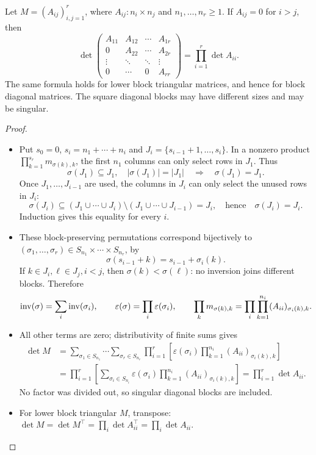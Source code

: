 \begin{theorem}\label{thm:05:block-triangular}
Let \(M=(A_{ij})_{i,j=1}^r\), where \(A_{ij}:n_i\times n_j\) and
\(n_1,\ldots,n_r\geqslant1\). If \(A_{ij}=0\) for \(i>j\), then
\[
\det\begin{pmatrix}
A_{11}&A_{12}&\cdots&A_{1r}\\
0&A_{22}&\cdots&A_{2r}\\
\vdots&\ddots&\ddots&\vdots\\
0&\cdots&0&A_{rr}
\end{pmatrix}
=\prod_{i=1}^r\det A_{ii}.
\]
The same formula holds for lower block triangular matrices, and hence
for block diagonal matrices. The square diagonal blocks may have
different sizes and may be singular.
\end{theorem}
\begin{proof}
\begin{itemize}
\item Put \(s_0=0\), \(s_i=n_1+\cdots+n_i\) and
  \(J_i=\{s_{i-1}+1,\ldots,s_i\}\).
  In a nonzero product \(\prod_{k=1}^{s_r}m_{\sigma(k),k}\), the first
  \(n_1\) columns can only select rows in \(J_1\). Thus
  \[
  \sigma(J_1)\subseteq J_1,\quad |\sigma(J_1)|=|J_1|
  \quad\Longrightarrow\quad\sigma(J_1)=J_1.
  \]
  Once \(J_1,\ldots,J_{i-1}\) are used, the columns in \(J_i\)
  can only select the unused rows in \(J_i\):
  \[
  \sigma(J_i)\subseteq (J_1\cup\cdots\cup J_i)
                 \setminus(J_1\cup\cdots\cup J_{i-1})=J_i,
  \quad\text{hence}\quad\sigma(J_i)=J_i.
  \]
  Induction gives this equality for every \(i\).
\item These block-preserving permutations correspond bijectively to
  \((\sigma_1,\ldots,\sigma_r)\in S_{n_1}\times\cdots\times S_{n_r}\), by
  \[
  \sigma(s_{i-1}+k)=s_{i-1}+\sigma_i(k).
  \]
  If \(k\in J_i,\ell\in J_j,i<j\), then \(\sigma(k)<\sigma(\ell)\):
  no inversion joins different blocks. Therefore
  \[
  \operatorname{inv}(\sigma)=\sum_i\operatorname{inv}(\sigma_i),\qquad
  \varepsilon(\sigma)=\prod_i\varepsilon(\sigma_i),\qquad
  \prod_k m_{\sigma(k),k}
    =\prod_i\prod_{k=1}^{n_i}(A_{ii})_{\sigma_i(k),k}.
  \]
\item All other terms are zero; distributivity of finite sums gives
  \[
  \begin{aligned}
  \det M
  &=\sum_{\sigma_1\in S_{n_1}}\cdots\sum_{\sigma_r\in S_{n_r}}
    \prod_{i=1}^r\left[\varepsilon(\sigma_i)
                      \prod_{k=1}^{n_i}(A_{ii})_{\sigma_i(k),k}\right]\\
  &=\prod_{i=1}^r\left[\sum_{\sigma_i\in S_{n_i}}\varepsilon(\sigma_i)
                      \prod_{k=1}^{n_i}(A_{ii})_{\sigma_i(k),k}\right]
   =\prod_{i=1}^r\det A_{ii}.
  \end{aligned}
  \]
  No factor was divided out, so singular diagonal blocks are included.
\item For lower block triangular \(M\), transpose:
  \(\det M=\det M^\top=\prod_i\det A_{ii}^\top=\prod_i\det A_{ii}\).
\end{itemize}
\end{proof}

